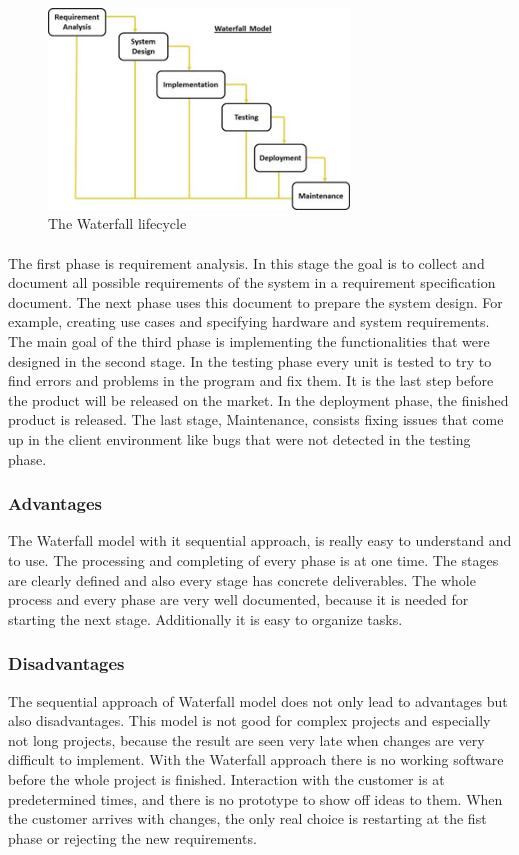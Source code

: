 \begin{figure}[ht!]
  \centering
  \includegraphics[width=80mm]{./PreliminaryStudies/img/waterfall}
  \caption{The Waterfall lifecycle}
  \label{fig:PrelimMethodWaterfall}
\end{figure}

\paragraph{}The first phase is requirement analysis. In this stage the goal is to collect and document all possible requirements of the system in a requirement specification document. The next phase uses this document to prepare the system design. For example, creating use cases and specifying hardware and system requirements. The main goal of the third phase is implementing the functionalities that were designed in the second stage. In the testing phase every unit is tested to try to find errors and problems in the program and fix them. It is the last step before the product will be released on the market. In the deployment phase, the finished product is released. The last stage, Maintenance, consists fixing issues that come up in the client environment like bugs that were not detected in the testing phase.

\subsubsection{Advantages}
The Waterfall model with it sequential approach, is really easy to understand and to use. The processing and completing of every phase is at one time. The stages are clearly defined and also every stage has concrete deliverables. The whole process and every phase are very well documented, because it is needed for starting the next stage. Additionally it is easy to organize tasks.

\subsubsection{Disadvantages}
The sequential approach of Waterfall model does not only lead to advantages but also disadvantages. This model is not good for complex projects and especially not long projects, because the result are seen very late when changes are very difficult to implement. With the Waterfall approach there is no working software before the whole project is finished.  Interaction with the customer is at predetermined times, and there is no prototype to show off ideas to them. When the customer arrives with changes, the only real choice is restarting at the fist phase or rejecting the new requirements.


